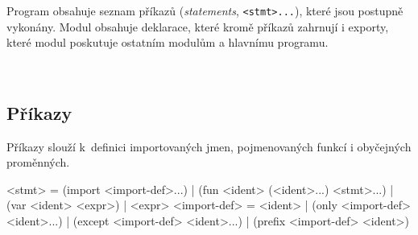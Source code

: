 Program obsahuje seznam příkazů (\emph{statements}, \texttt{<stmt>...}), které
jsou postupně vykonány. Modul obsahuje deklarace, které kromě příkazů zahrnují i
exporty, které modul poskutuje ostatním modulům a hlavnímu programu.

~
\subsection{Příkazy}

Příkazy slouží k~definici importovaných jmen, pojmenovaných funkcí i obyčejných
proměnných.

\begin{ttcode}
<stmt>        = (import <import-def>...)
              | (fun <ident> (<ident>...) <stmt>...)
              | (var <ident> <expr>)
              | <expr>
<import-def>  = <ident>
              | (only <import-def> <ident>...)
              | (except <import-def> <ident>...)
              | (prefix <import-def> <ident>)
\end{ttcode}


